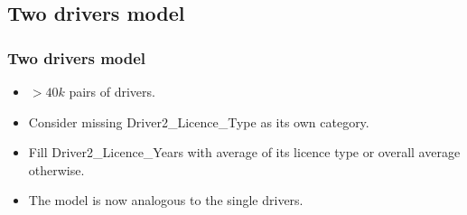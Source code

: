 \documentclass{beamer}
\theoremstyle{definition}
\begin{document}
\subsection{Two drivers model}
\begin{frame}
\frametitle{Two drivers model}
\begin{itemize}
\item $>40k$ pairs of drivers.
\item<1-> Consider missing Driver2\_Licence\_Type as its own category. %
\item<2-> Fill Driver2\_Licence\_Years with average of its licence type or overall average otherwise. %
\item<3-> The model is now analogous to the single drivers. %
\end{itemize}
\end{frame}
\end{document}

